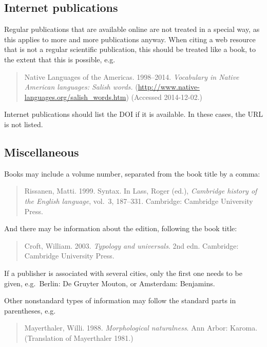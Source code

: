 \documentclass[a4paper]{article}
\newenvironment{gsrexq}{\begin{quote}\color{blue}}{\end{quote}}
\newcommand{\gsrex}[1]{{\color{blue}#1}}
\begin{document}
\subsection{Internet publications}\label{sec:internet-publications}

Regular publications that are available online are not treated in a
special way, as this applies to more and more publications anyway. When
citing a web resource that is not a regular scientific publication, this
should be treated like a book, to the extent that this is possible,
e.g.

\begin{gsrexq}
Native Languages of the Americas. 1998--2014. \textit{Vocabulary in Native American languages: Salish words.} (\url{http://www.native-languages.org/salish_words.htm}) (Accessed 2014-12-02.)
\end{gsrexq}

Internet publications should list the DOI if it is available. In these cases, the URL is not listed. 

\subsection{Miscellaneous}\label{sec:miscellaneous}

Books may include a volume number, separated from the book title by a
comma: 

\begin{gsrexq}
Rissanen, Matti. 1999. Syntax. In Lass, Roger (ed.), \textit{Cambridge history of the English language}, vol.~3, 187--331. 
Cambridge: Cambridge University Press. 
\end{gsrexq}

And there may be information about the edition,
following the book title: 

\begin{gsrexq}
Croft, William. 2003. \textit{Typology and universals}.
2nd edn. Cambridge: Cambridge University Press.
\end{gsrexq}

If a publisher is
associated with several cities, only the first one needs to be given,
e.g.~\gsrex{Berlin: De Gruyter Mouton}, or \gsrex{Amsterdam: Benjamins}.

Other
nonstandard types of information may follow the standard parts in
parentheses, e.g.~

\begin{gsrexq}
Mayerthaler, Willi. 1988. \textit{Morphological naturalness}.
Ann Arbor: Karoma. (Translation of Mayerthaler 1981.)
\end{gsrexq}
\end{document}
